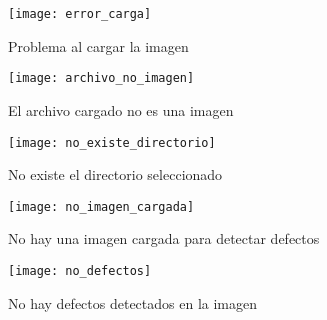\begin{figure}[htb]
	\centering
	\texttt{[image: error\_carga]}
	\caption{Problema al cargar la imagen}
	\label{error_carga}
\end{figure}

\begin{figure}[htb]
	\centering
	\texttt{[image: archivo\_no\_imagen]}
	\caption{El archivo cargado no es una imagen}
	\label{archivo_no_imagen}
\end{figure}

\begin{figure}[htb]
	\centering
	\texttt{[image: no\_existe\_directorio]}
	\caption{No existe el directorio seleccionado}
	\label{no_existe_directorio}
\end{figure}

\begin{figure}[htb]
	\centering
	\texttt{[image: no\_imagen\_cargada]}
	\caption{No hay una imagen cargada para detectar defectos}
	\label{no_imagen_cargada}
\end{figure}

\begin{figure}[htb]
	\centering
	\texttt{[image: no\_defectos]}
	\caption{No hay defectos detectados en la imagen}
	\label{no_defectos}
\end{figure}